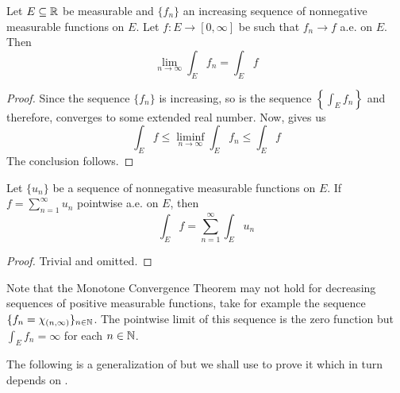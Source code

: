 \begin{theorem}
    Let $E\subseteq\mathbb{R}$ be measurable and $\{f_n\}$ an increasing sequence of nonnegative measurable functions on $E$. Let $f: E\to[0,\infty]$ be such that $f_n\to f$ a.e. on $E$. Then 
    \begin{equation*}
        \lim_{n\to\infty}\int_E f_n = \int_E f
    \end{equation*}
\end{theorem}
\begin{proof}
    Since the sequence $\{f_n\}$ is increasing, so is the sequence $\left\{\int_E f_n\right\}$ and therefore, converges to some extended real number. Now,  gives us 
    \begin{equation*}
        \int_E f\le\liminf_{n\to\infty}\int_E f_n\le\int_E f
    \end{equation*}
    The conclusion follows.
\end{proof}

\begin{corollary}
    Let $\{u_n\}$ be a sequence of nonnegative measurable functions on $E$. If $f = \sum_{n = 1}^\infty u_n$ pointwise a.e. on $E$, then 
    \begin{equation*}
        \int_E f = \sum_{n = 1}^\infty\int_E u_n
    \end{equation*}
\end{corollary}
\begin{proof}
    Trivial and omitted.
\end{proof}

Note that the Monotone Convergence Theorem may not hold for decreasing sequences of positive measurable functions, take for example the sequence $\{f_n = \chi_{(n,\infty)}\}_{n\in\mathbb{N}}$. The pointwise limit of this sequence is the zero function but $\int_E f_n = \infty$ for each $n\in\mathbb{N}$.

The following is a generalization of  but we shall use  to prove it which in turn depends on .

